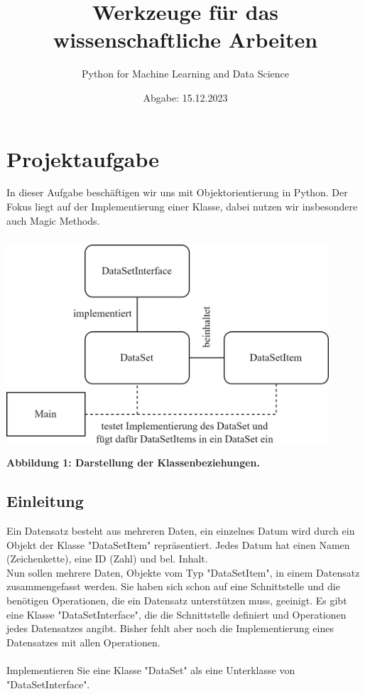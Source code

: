 \documentclass[
	12pt,
	a4paper,
	parskip=full
]{article}
\begin{document}
	
	\title{\bf Werkzeuge für das wissenschaftliche Arbeiten}
	\author {Python for Machine Learning and Data Science}
	\date{Abgabe: 15.12.2023}
	\maketitle

	\tableofcontents


	\section{Projektaufgabe}
		In dieser Aufgabe beschäftigen wir uns mit Objektorientierung in Python.
		Der Fokus liegt auf der Implementierung einer Klasse, dabei nutzen wir insbesondere auch Magic Methods.
		
		\begin{center}
			\includegraphics[width=12cm, height=8cm]{./../diagram/classes_files.png}\\
			\scriptsize\bf Abbildung 1: \normalfont Darstellung der Klassenbeziehungen.\normalsize\\
		\end{center}
		
		\subsection{Einleitung}
			Ein Datensatz besteht aus mehreren Daten, ein einzelnes Datum wird durch ein Objekt der Klasse "DataSetItem" repräsentiert.
			Jedes Datum hat einen Namen (Zeichenkette), eine ID (Zahl) und bel. Inhalt.\\
			Nun sollen mehrere Daten, Objekte vom Typ "DataSetItem", in einem Datensatz zusammengefasst werden.
			Sie haben sich schon auf eine Schnittstelle und die benötigen Operationen, die ein Datensatz unterstützen muss, geeinigt.	
			Es gibt eine Klasse "DataSetInterface", die die Schnittstelle definiert und Operationen jedes Datensatzes angibt.
			Bisher fehlt aber noch die Implementierung eines Datensatzes mit allen Operationen.\\
			\\
			Implementieren Sie eine Klasse "DataSet" als eine Unterklasse von "DataSetInterface".\\
		\\
\end{document}
